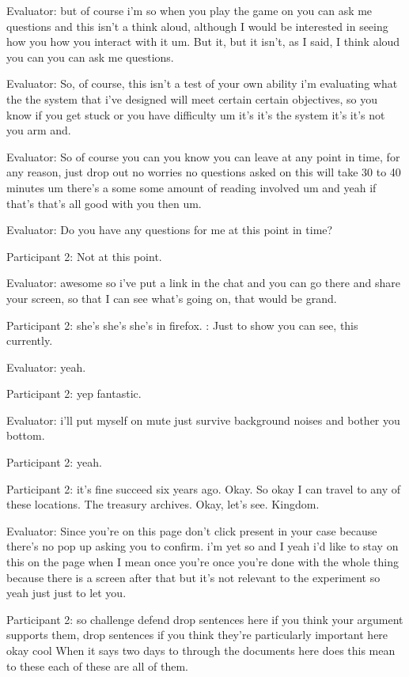 \documentclass{l4proj}
\begin{document}
\begin{appendices}
Evaluator: but of course i'm so when you play the game on you can ask me questions and this isn't a think aloud, although I would be interested in seeing how you how you interact with it um. But it, but it isn't, as I said, I think aloud you can you can ask me questions.

Evaluator: So, of course, this isn't a test of your own ability i'm evaluating what the the system that i've designed will meet certain certain objectives, so you know if you get stuck or you have difficulty um it's it's the system it's it's not you arm and.

Evaluator: So of course you can you know you can leave at any point in time, for any reason, just drop out no worries no questions asked on this will take 30 to 40 minutes um there's a some some amount of reading involved um and yeah if that's that's all good with you then um.

Evaluator: Do you have any questions for me at this point in time?

Participant 2: Not at this point.

Evaluator: awesome so i've put a link in the chat and you can go there and share your screen, so that I can see what's going on, that would be grand.

Participant 2: she's she's she's in firefox. : Just to show you can see, this currently.

Evaluator: yeah.

Participant 2: yep fantastic.
 
Evaluator: i'll put myself on mute just survive background noises and bother you bottom.

Participant 2: yeah.

Participant 2: it's fine succeed six years ago. Okay. So okay I can travel to any of these locations. The treasury archives. Okay, let's see. Kingdom.

Evaluator: Since you're on this page don't click present in your case because there's no pop up asking you to confirm. i'm yet so and I yeah i'd like to stay on this on the page when I mean once you're once you're done with the whole thing because there is a screen after that but it's not relevant to the experiment so yeah just just to let you.

Participant 2: so challenge defend drop sentences here if you think your argument supports them, drop sentences if you think they’re particularly important here okay cool When it says two days to through the documents here does this mean to these each of these are all of them.


\end{appendices}
\end{document}
